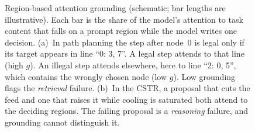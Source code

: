 \begin{table}[!htbp]
\centering
\small
\caption{Pre-registered deciding regions $R^{\star}$ per CSTR setpoint (prompt v3.1). Snapshot fields are single
lines of the prompt's plant snapshot; knowledge-graph (KG) statements are complete Turtle statements that mention
the operator.}
\label{tab:regions}
\end{table}

\begin{figure}[!htbp]
\centering

\caption{Region-based attention grounding (schematic; bar lengths are illustrative). Each bar is the share of
the model's attention to task content that falls on a prompt region while the model writes one decision.
(a)~In path planning the step after node~0 is legal only if its target appears in line ``0: 3, 7''. A legal step
attends to that line (high $g$). An illegal step attends elsewhere, here to line ``2: 0, 5'', which contains the
wrongly chosen node (low $g$). Low grounding flags the \emph{retrieval} failure. (b)~In the CSTR, a proposal that
cuts the feed and one that raises it while cooling is saturated both attend to the deciding regions. The failing
proposal is a \emph{reasoning} failure, and grounding cannot distinguish it.}
\label{fig:grounding}
\end{figure}

